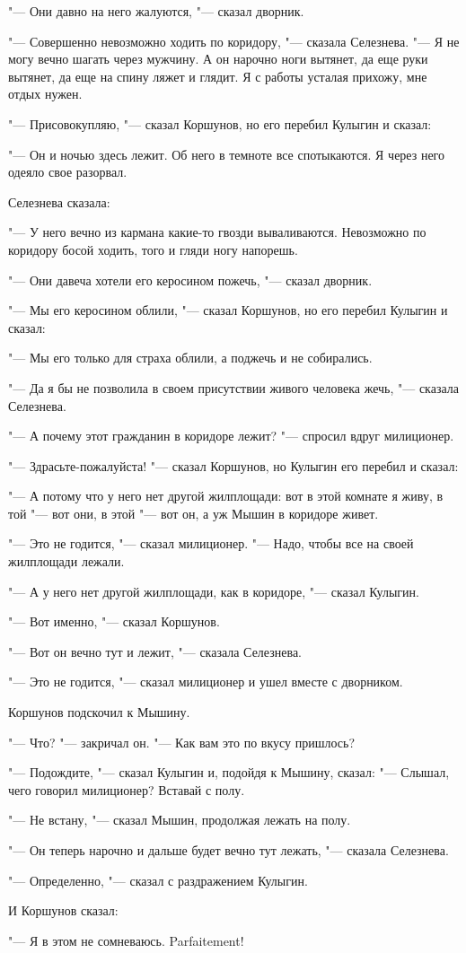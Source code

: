 "--- Они давно на него жалуются, "--- сказал дворник.

"--- Совершенно невозможно ходить по коридору, "--- сказала Селезнева. "--- Я не могу вечно шагать через мужчину. А он нарочно ноги вытянет, да еще руки вытянет, да еще на спину ляжет и глядит. Я с работы усталая прихожу, мне отдых нужен.

"--- Присовокупляю, "--- сказал Коршунов, но его перебил Кулыгин и сказал:

"--- Он и ночью здесь лежит. Об него в темноте все спотыкаются. Я через него одеяло свое разорвал.

Селезнева сказала:

"--- У него вечно из кармана какие-то гвозди вываливаются. Невозможно по коридору босой ходить, того и гляди ногу напорешь.

"--- Они давеча хотели его керосином пожечь, "--- сказал дворник.

"--- Мы его керосином облили, "--- сказал Коршунов, но его перебил Кулыгин и сказал:

"--- Мы его только для страха облили, а поджечь и не собирались.

"--- Да я бы не позволила в своем присутствии живого человека жечь, "--- сказала Селезнева.

"--- А почему этот гражданин в коридоре лежит? "--- спросил вдруг милиционер.

"--- Здрасьте-пожалуйста! "--- сказал Коршунов, но Кулыгин его перебил и сказал:

"--- А потому что у него нет другой жилплощади: вот в этой комнате я живу, в той "--- вот они, в этой "--- вот он, а уж Мышин в коридоре живет.

"--- Это не годится, "--- сказал милиционер. "--- Надо, чтобы все на своей жилплощади лежали.

"--- А у него нет другой жилплощади, как в коридоре, "--- сказал Кулыгин.

"--- Вот именно, "--- сказал Коршунов.

"--- Вот он вечно тут и лежит, "--- сказала Селезнева.

"--- Это не годится, "--- сказал милиционер и ушел вместе с дворником.

Коршунов подскочил к Мышину.

"--- Что? "--- закричал он. "--- Как вам это по вкусу пришлось?

"--- Подождите, "--- сказал Кулыгин и, подойдя к Мышину, сказал: "--- Слышал, чего говорил милиционер? Вставай с полу.

"--- Не встану, "--- сказал Мышин, продолжая лежать на полу.

"--- Он теперь нарочно и дальше будет вечно тут лежать, "--- сказала Селезнева.

"--- Определенно, "--- сказал с раздражением Кулыгин.

И Коршунов сказал:

"--- Я в этом не сомневаюсь. Parfaitement!